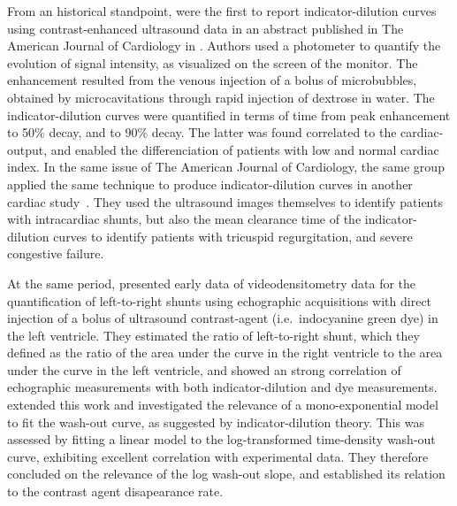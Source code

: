 From an historical standpoint, \citet{Bommer:1978eu} were the first to report indicator-dilution curves using contrast-enhanced ultrasound data in an abstract published in The American Journal of Cardiology in \citeyear{Bommer:1978eu}. %
Authors used a photometer to quantify the evolution of signal intensity, as visualized on the screen of the monitor.
The enhancement resulted from the venous injection of a bolus of microbubbles, obtained by microcavitations through rapid injection of dextrose in water. 
The indicator-dilution curves were quantified in terms of time from peak enhancement to 50\% decay, and to 90\% decay. 
The latter was found correlated to the cardiac-output, and enabled the differenciation of patients with low and normal cardiac index. 
In the same issue of The American Journal of Cardiology, the same group applied the same technique to produce indicator-dilution curves in another cardiac study~\cite{DeMaria:1978il}. %
They used the ultrasound images themselves to identify patients with intracardiac shunts, but also the mean clearance time of the indicator-dilution curves to identify patients with tricuspid regurgitation, and severe congestive failure.

At the same period, \citet{Hagler:1982hs} presented early data of videodensitometry data for the quantification of left-to-right shunts using echographic acquisitions with direct injection of a bolus of ultrasound contrast-agent (i.e.~indocyanine green dye) in the left ventricle. %
They estimated the ratio of left-to-right shunt, which they defined as the ratio of the area under the curve in the right ventricle to the area under the curve in the left ventricle, and showed an strong correlation of echographic measurements with both indicator-dilution and dye measurements.
\citet{Meltzer:1982vt} extended this work and investigated the relevance of a mono-exponential model to fit the wash-out curve, as suggested by indicator-dilution theory. %
This was assessed by fitting a linear model to the log-transformed time-density wash-out curve, exhibiting excellent correlation with experimental data. 
They therefore concluded on the relevance of the log wash-out slope, and established its relation to the contrast agent disapearance rate. 

